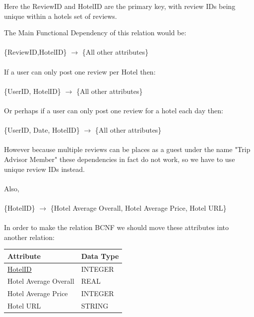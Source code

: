 \documentclass[11pt,epsfig]{article}
\begin{document}
Here the ReviewID and  HotelID are the primary key, with review IDs being unique within a hotels set of reviews.

The Main Functional Dependency of this relation would be:
\paragraph{}
\{ReviewID,HotelID\} $\rightarrow$ \{All other attributes\}
\paragraph{}
If a user can only post one review per Hotel then:
\paragraph{}
\{UserID, HotelID\} $\rightarrow$ \{All other attributes\} 
\paragraph{}
Or perhaps if a user can only post one review for a hotel each day then:
\paragraph{}
\{UserID, Date, HotelID\} $\rightarrow$ \{All other attributes\}
\paragraph{}
However because multiple reviews can be places as a guest under the name "Trip Advisor Member" these dependencies in fact do not work, so we have to use unique review IDs instead.
\paragraph{}
Also,
\paragraph{}
\{HotelID\} $\rightarrow$ \{Hotel Average Overall, Hotel Average Price, Hotel URL\}
\paragraph{}
In order to make the relation BCNF we should move these attributes into another relation:

\begin{table}[!htbp]
\centering
\begin{tabular}{|l|l|}
\hline
\textbf{Attribute} & \textbf{Data Type} \\ \hline
\underline{HotelID} & INTEGER \\ \hline
Hotel Average Overall & REAL \\ \hline
Hotel Average Price & INTEGER \\ \hline
Hotel URL & STRING \\ \hline
\end{tabular}
\end{table}
\end{document}
